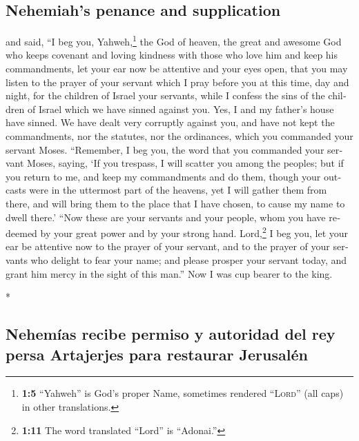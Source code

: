 \begin{paracol}{2}
\begin{otherlanguage}{english}
\hypertarget{nehemiahs-penance-and-supplication}{%
\subsection{Nehemiah's penance and
supplication}\label{nehemiahs-penance-and-supplication}}

 and said, ``I beg you, Yahweh,\footnote{\textbf{1:5}
  ``Yahweh'' is God's proper Name, sometimes rendered ``\textsc{Lord}''
  (all caps) in other translations.} the God of heaven, the great and
awesome God who keeps covenant and loving kindness with those who love
him and keep his commandments,  let your ear now be
attentive and your eyes open, that you may listen to the prayer of your
servant which I pray before you at this time, day and night, for the
children of Israel your servants, while I confess the sins of the
children of Israel which we have sinned against you. Yes, I and my
father's house have sinned.  We have dealt very corruptly
against you, and have not kept the commandments, nor the statutes, nor
the ordinances, which you commanded your servant Moses. 
``Remember, I beg you, the word that you commanded your servant Moses,
saying, `If you trespass, I will scatter you among the peoples;
 but if you return to me, and keep my commandments and do
them, though your outcasts were in the uttermost part of the heavens,
yet I will gather them from there, and will bring them to the place that
I have chosen, to cause my name to dwell there.'  ``Now
these are your servants and your people, whom you have redeemed by your
great power and by your strong hand.  Lord,\footnote{\textbf{1:11}
  The word translated ``Lord'' is ``Adonai.''} I beg you, let your ear
be attentive now to the prayer of your servant, and to the prayer of
your servants who delight to fear your name; and please prosper your
servant today, and grant him mercy in the sight of this man.'' Now I was
cup bearer to the king.

\end{otherlanguage}

\switchcolumn[0]*

\hypertarget{nehemuxedas-recibe-permiso-y-autoridad-del-rey-persa-artajerjes-para-restaurar-jerusaluxe9n}{%
\subsection{Nehemías recibe permiso y autoridad del rey persa Artajerjes
para restaurar
Jerusalén}\label{nehemuxedas-recibe-permiso-y-autoridad-del-rey-persa-artajerjes-para-restaurar-jerusaluxe9n}}


\end{paracol}
